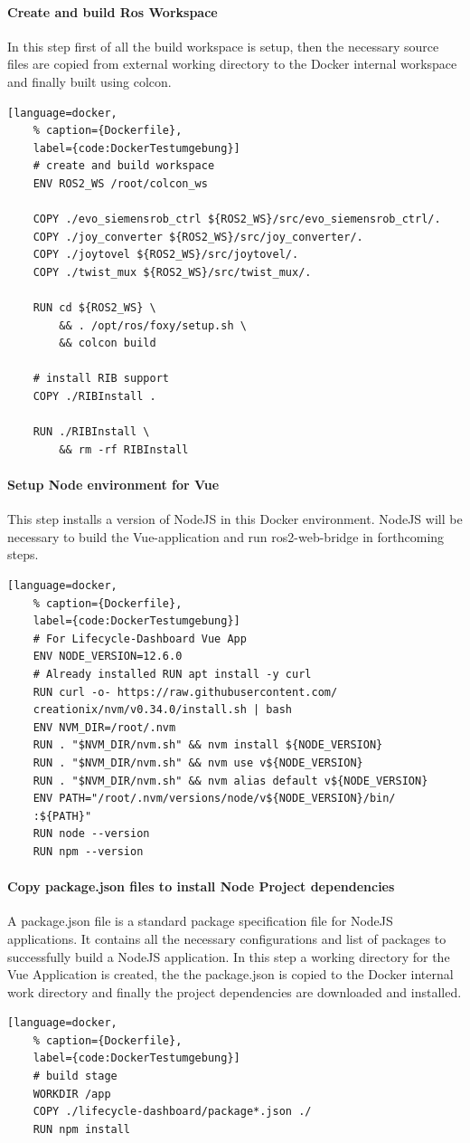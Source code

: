 \paragraph*{Create and build Ros Workspace} In this step first of all the build workspace is setup, then the necessary source files are copied from external working directory to the Docker internal workspace and finally built using colcon.
\begin{lstlisting}[language=docker,
	% caption={Dockerfile}, 
	label={code:DockerTestumgebung}]
	# create and build workspace
	ENV ROS2_WS /root/colcon_ws
		
	COPY ./evo_siemensrob_ctrl ${ROS2_WS}/src/evo_siemensrob_ctrl/.
	COPY ./joy_converter ${ROS2_WS}/src/joy_converter/.
	COPY ./joytovel ${ROS2_WS}/src/joytovel/.
	COPY ./twist_mux ${ROS2_WS}/src/twist_mux/.

	RUN cd ${ROS2_WS} \
		&& . /opt/ros/foxy/setup.sh \
		&& colcon build
		
	# install RIB support
	COPY ./RIBInstall .

	RUN ./RIBInstall \
		&& rm -rf RIBInstall
\end{lstlisting}

\paragraph{Setup Node environment for Vue} This step installs a version of NodeJS in this Docker environment. NodeJS will be necessary to build the Vue-application and run ros2-web-bridge in forthcoming steps. 
\begin{lstlisting}[language=docker,
	% caption={Dockerfile}, 
	label={code:DockerTestumgebung}]
	# For Lifecycle-Dashboard Vue App
	ENV NODE_VERSION=12.6.0
	# Already installed RUN apt install -y curl
	RUN curl -o- https://raw.githubusercontent.com/
	creationix/nvm/v0.34.0/install.sh | bash
	ENV NVM_DIR=/root/.nvm
	RUN . "$NVM_DIR/nvm.sh" && nvm install ${NODE_VERSION}
	RUN . "$NVM_DIR/nvm.sh" && nvm use v${NODE_VERSION}
	RUN . "$NVM_DIR/nvm.sh" && nvm alias default v${NODE_VERSION}
	ENV PATH="/root/.nvm/versions/node/v${NODE_VERSION}/bin/
	:${PATH}"
	RUN node --version
	RUN npm --version
\end{lstlisting}



\paragraph{Copy package.json files to install Node Project dependencies} A package.json file is a standard package specification file for NodeJS applications. It contains all the necessary configurations and list of packages to successfully build a NodeJS application. In this step 
a working directory for the Vue Application is created, the the package.json is copied to the Docker internal work directory and finally the project dependencies are downloaded and installed.
\begin{lstlisting}[language=docker,
	% caption={Dockerfile}, 
	label={code:DockerTestumgebung}]
	# build stage
	WORKDIR /app
	COPY ./lifecycle-dashboard/package*.json ./
	RUN npm install
\end{lstlisting}

